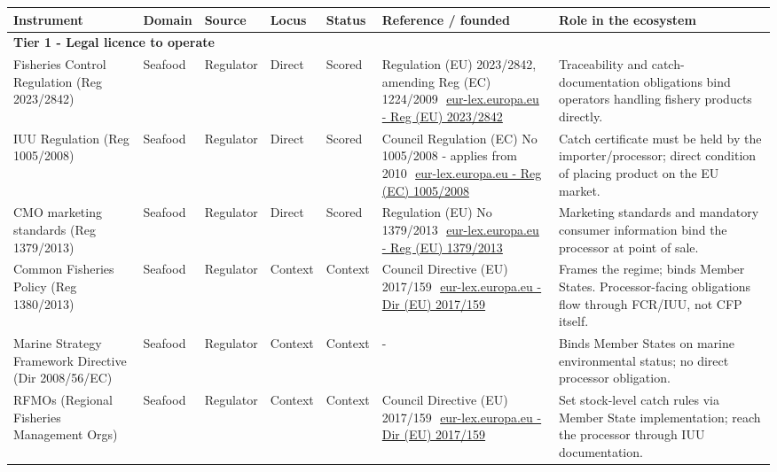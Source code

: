 \begin{landscape}\footnotesize\setlength{\tabcolsep}{4pt}\renewcommand{\arraystretch}{1.15}
\begin{longtable}{p{2.9cm}p{1.2cm}p{1.3cm}p{1.2cm}p{1.4cm}p{3.2cm}p{5.9cm}}
\toprule \textbf{Instrument} & \textbf{Domain} & \textbf{Source} & \textbf{Locus} & \textbf{Status} & \textbf{Reference / founded} & \textbf{Role in the ecosystem} \\ \midrule \endhead
\multicolumn{7}{l}{\rule{0pt}{1.1em}\textbf{Tier 1 - Legal licence to operate}}\\[1pt]
Fisheries Control Regulation (Reg 2023/2842) & Seafood & Regulator & Direct & Scored & Regulation (EU) 2023/2842, amending Reg (EC) 1224/2009~\,\href{https://eur-lex.europa.eu/eli/reg/2023/2842/oj}{eur-lex.europa.eu - Reg (EU) 2023/2842} & Traceability and catch-documentation obligations bind operators handling fishery products directly. \\
IUU Regulation (Reg 1005/2008) & Seafood & Regulator & Direct & Scored & Council Regulation (EC) No 1005/2008 - applies from 2010~\,\href{https://eur-lex.europa.eu/eli/reg/2008/1005/oj}{eur-lex.europa.eu - Reg (EC) 1005/2008} & Catch certificate must be held by the importer/processor; direct condition of placing product on the EU market. \\
CMO marketing standards (Reg 1379/2013) & Seafood & Regulator & Direct & Scored & Regulation (EU) No 1379/2013~\,\href{https://eur-lex.europa.eu/eli/reg/2013/1379/oj}{eur-lex.europa.eu - Reg (EU) 1379/2013} & Marketing standards and mandatory consumer information bind the processor at point of sale. \\
Common Fisheries Policy (Reg 1380/2013) & Seafood & Regulator & Context & Context & Council Directive (EU) 2017/159~\,\href{https://eur-lex.europa.eu/eli/dir/2017/159/oj}{eur-lex.europa.eu - Dir (EU) 2017/159} & Frames the regime; binds Member States. Processor-facing obligations flow through FCR/IUU, not CFP itself. \\
Marine Strategy Framework Directive (Dir 2008/56/EC) & Seafood & Regulator & Context & Context & - & Binds Member States on marine environmental status; no direct processor obligation. \\
RFMOs (Regional Fisheries Management Orgs) & Seafood & Regulator & Context & Context & Council Directive (EU) 2017/159~\,\href{https://eur-lex.europa.eu/eli/dir/2017/159/oj}{eur-lex.europa.eu - Dir (EU) 2017/159} & Set stock-level catch rules via Member State implementation; reach the processor through IUU documentation. \\

\end{longtable}
\end{landscape}
